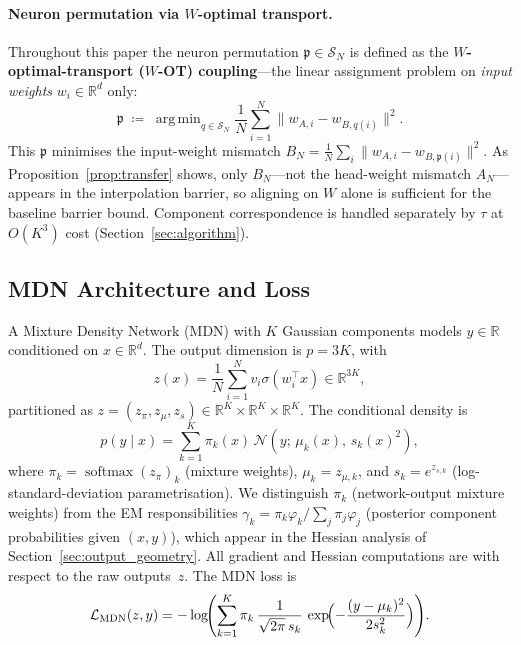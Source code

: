\documentclass[11pt]{article}
\DeclareMathOperator*{\argmin}{arg\,min}
\DeclareMathOperator{\softmax}{softmax}
\newcommand{\R}{\mathbb{R}}
\newcommand{\cL}{\mathcal{L}}
\newcommand{\cS}{\mathcal{S}}
\newcommand{\cN}{\mathcal{N}}
\newcommand{\nperm}{\mathfrak{p}}  %
\begin{document}
\paragraph{Neuron permutation via $W$-optimal transport.}
Throughout this paper the neuron permutation $\nperm \in \cS_N$ is
defined as the \textbf{$W$-optimal-transport ($W$-OT) coupling}---the
linear assignment problem on \emph{input weights} $w_i \in \R^d$ only:
\begin{equation}\label{eq:OT_perm}
  \nperm \;\coloneqq\; \argmin_{q \in \cS_N}
  \frac{1}{N}\sum_{i=1}^N \|w_{A,i} - w_{B,q(i)}\|^2.
\end{equation}
This $\nperm$ minimises the input-weight mismatch
$B_N = \frac{1}{N}\sum_i\|w_{A,i}-w_{B,\nperm(i)}\|^2$.
As Proposition~\ref{prop:transfer} shows, only $B_N$---not the
head-weight mismatch $A_N$---appears in the interpolation barrier,
so aligning on $W$ alone is sufficient for the baseline barrier bound.
Component correspondence is handled separately by $\tau$ at
$O(K^3)$ cost (Section~\ref{sec:algorithm}).

\subsection{MDN Architecture and Loss}\label{sec:mdn}

A Mixture Density Network (MDN) with $K$ Gaussian components
models $y \in \R$ conditioned on $x \in \R^d$.
The output dimension is $p = 3K$, with
\begin{equation}\label{eq:mdn_output}
  z(x) = \frac{1}{N}\sum_{i=1}^N v_i \sigma(w_i^\top x)
  \in \R^{3K},
\end{equation}
partitioned as $z = (z_\pi, z_\mu, z_s) \in \R^K \times \R^K \times \R^K$.
The conditional density is
\[
  p(y \mid x) = \sum_{k=1}^K \pi_k(x)\,
  \cN(y;\,\mu_k(x),\,s_k(x)^2),
\]
where $\pi_k = \softmax(z_\pi)_k$ (mixture weights), $\mu_k = z_{\mu,k}$,
and $s_k = e^{z_{s,k}}$ (log-standard-deviation parametrisation).
We distinguish $\pi_k$ (network-output mixture weights) from the
EM responsibilities $\gamma_k = \pi_k\varphi_k / \sum_j \pi_j\varphi_j$
(posterior component probabilities given $(x,y)$), which appear in
the Hessian analysis of Section~\ref{sec:output_geometry}.
All gradient and Hessian computations are with respect to the raw
outputs~$z$. The MDN loss is
\begin{equation}\label{eq:mdn_loss}
  \cL_{\mathrm{MDN}}(z, y)
  = -\log\!\Biggl(\sum_{k=1}^K \pi_k\,
    \frac{1}{\sqrt{2\pi}\,s_k}\,
    \exp\!\Bigl(-\frac{(y-\mu_k)^2}{2s_k^2}\Bigr)\Biggr).
\end{equation}
\end{document}
